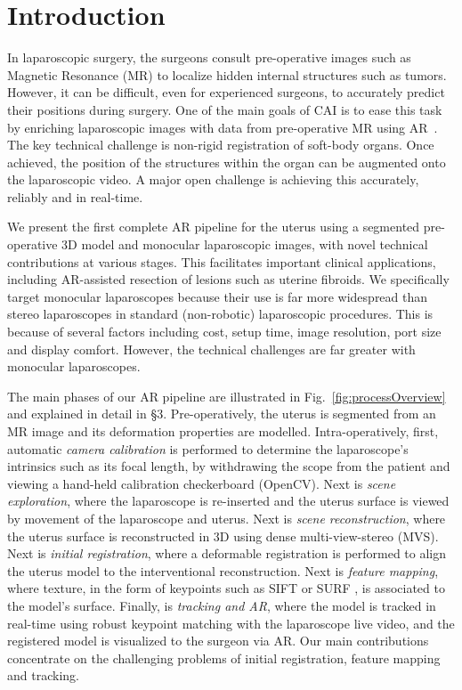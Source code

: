 
\section{Introduction}
In laparoscopic surgery, the surgeons consult pre-operative images such as Magnetic Resonance (MR) to localize hidden internal structures such as tumors. However, it can be difficult, even for experienced surgeons, to accurately predict their positions during surgery. 
One of the main goals of CAI is to ease this task by enriching laparoscopic images with data from pre-operative MR using AR~\cite{1732,8714}. 
The key technical challenge is non-rigid registration of soft-body organs. Once achieved, the position of the structures within the organ can be augmented onto the laparoscopic video. A major open challenge is achieving this accurately, reliably and in real-time. 

We present the first complete AR pipeline for the uterus using a segmented pre-operative 3D model and monocular laparoscopic images, with novel technical contributions at various stages. This facilitates important clinical applications, including AR-assisted resection of lesions such as uterine fibroids. We specifically target monocular laparoscopes because their use is far more widespread than stereo laparoscopes in standard (non-robotic) laparoscopic procedures. This is because of several factors including
cost, setup time, image resolution, port size
and display comfort. However, the technical challenges are far greater with monocular laparoscopes. 

The main phases of our AR pipeline are illustrated in Fig.~\ref{fig:processOverview} and explained in detail in \S3. Pre-operatively, the uterus is segmented from an MR image and its deformation properties are modelled. Intra-operatively, first, automatic \emph{camera calibration} is performed to determine the laparoscope's intrinsics such as its focal length, by withdrawing the scope from the patient and viewing a hand-held calibration checkerboard (OpenCV). Next is \emph{scene exploration}, where the laparoscope is re-inserted and the uterus surface is viewed by movement of the laparoscope and uterus. Next is \emph{scene reconstruction}, where the uterus surface is reconstructed in 3D using dense multi-view-stereo (MVS). Next is \emph{initial registration}, where a deformable registration is performed to align the uterus model to the interventional reconstruction. Next is \emph{feature mapping}, where texture, in the form of keypoints such as SIFT \cite{Lowe:2004:DIF:993451.996342} or SURF \cite{SURF}, is associated to the model's surface. Finally, is \emph{tracking and AR}, where the model is tracked in real-time using robust keypoint matching with the laparoscope live video, and the registered model is visualized to the surgeon via AR. Our main contributions concentrate on the challenging problems of initial registration, feature mapping and tracking. 


